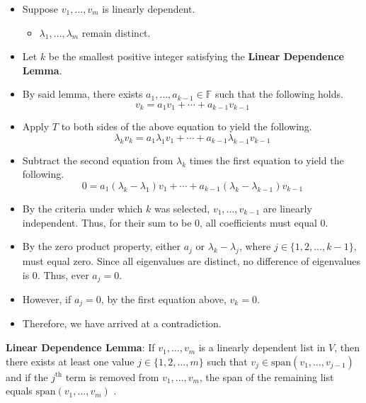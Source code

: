 \documentclass[titlepage]{article}
\numberwithin{figure}{section}
\numberwithin{equation}{section}
\numberwithin{theorem}{section}
\newcommand{\F}{\mathbb{F}}
\begin{document}
    \begin{itemize}
        \item Suppose $v_1,\dots,v_m$ is linearly dependent.
        \begin{itemize}
            \item $\lambda_1,\dots,\lambda_m$ remain distinct.
        \end{itemize}
        \item Let $k$ be the smallest positive integer satisfying the \textbf{Linear Dependence Lemma}.
        \item By said lemma, there exists $a_1,\dots,a_{k-1}\in\F$ such that the following holds.
        \begin{equation*}
            v_k = a_1v_1+\cdots+a_{k-1}v_{k-1}
        \end{equation*}
        \item Apply $T$ to both sides of the above equation to yield the following.
        \begin{equation*}
            \lambda_kv_k = a_1\lambda_1v_1+\cdots+a_{k-1}\lambda_{k-1}v_{k-1}
        \end{equation*}
        \item Subtract the second equation from $\lambda_k$ times the first equation to yield the following.
        \begin{equation*}
            0 = a_1(\lambda_k-\lambda_1)v_1+\cdots+a_{k-1}(\lambda_k-\lambda_{k-1})v_{k-1}
        \end{equation*}
        \item By the criteria under which $k$ was selected, $v_1,\dots,v_{k-1}$ are linearly independent. Thus, for their sum to be 0, all coefficients must equal 0.
        \item By the zero product property, either $a_j$ or $\lambda_k-\lambda_j$, where $j\in\{1,2,\dots,k-1\}$, must equal zero. Since all eigenvalues are distinct, no difference of eigenvalues is 0. Thus, ever $a_j=0$.
        \item However, if $a_j=0$, by the first equation above, $v_k=0$.
        \item Therefore, we have arrived at a contradiction.
    \end{itemize}
    \item \textbf{Linear Dependence Lemma}: If $v_1,\dots,v_m$ is a linearly dependent list in $V$, then there exists at least one value $j\in\{1,2,\dots,m\}$ such that $v_j\in\text{span}(v_1,\dots,v_{j-1})$ and if the $j^\text{th}$ term is removed from $v_1,\dots,v_m$, the span of the remaining list equals $\text{span}(v_1,\dots,v_m)$ \cite[34]{bib:Axler}.
\end{document}
